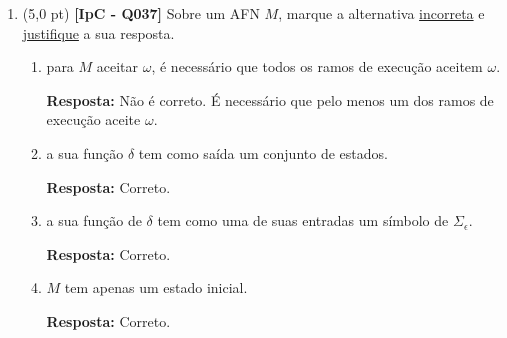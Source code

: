 \documentclass[12pt,a4paper,oneside]{article}
\begin{document}
\begin{enumerate}
	{ \color{blue} {\bf Resposta:} Seja um AFN $N = \{Q, \Sigma \delta, q_0, F\}$. Podemos construir um AFN $O = \{Q', \Sigma' \delta', q_0', F'\}$ que seja equivalente a $N$. Os elementos de $O$ são descritos a seguir:
		\begin{itemize}
			\item $Q' = Q \cup \{q_{novo}\}$;
			\item $\Sigma' = \Sigma$;
			\item $\delta'(q,a) = \left\{\begin{array}{cl}
				\delta(q,a), & \text{se } q \in Q \setminus F\\
				\delta(q,a), & \text{se } q \in F \text{ e } a \not= \epsilon\\
				\delta(q,a) \cup \{ q_{novo} \}, & \text{se } q \in F \text{ e } a = \epsilon\\
				\emptyset	& \text{se } q=q_{novo}\\
				\end{array} \right.$\\
			\item $q_0' = q_0$;
			\item $F' = \{ q_{novo} \}$.
		\end{itemize}
		Logo, todo AFN pode ser convertido em um AFN equivalente que tenha apenas um único estado de aceitação $\blacksquare$.
	}

	\item (5,0 pt) {\bf [IpC - Q037]} Sobre um AFN $M$, marque a alternativa \underline{incorreta} e \underline{justifique} a sua resposta.
\begin{enumerate}
\item para $M$ aceitar $\omega$, é necessário que todos os ramos de execução aceitem $\omega$.

\vspace*{0.3cm}

{ \color{red} {\bf Resposta:} Não é correto. É necessário que pelo menos um dos ramos de execução aceite $\omega$.}

\item a sua função $\delta$ tem como saída um conjunto de estados.

\vspace*{0.3cm}

{ \color{blue} {\bf Resposta:} Correto.}

\item a sua função de $\delta$ tem como uma de suas entradas um símbolo de $\Sigma_{\epsilon}$.

\vspace*{0.3cm}

{ \color{blue} {\bf Resposta:} Correto.}

\item $M$ tem apenas um estado inicial.

\vspace*{0.3cm}

{ \color{blue} {\bf Resposta:} Correto.}

\end{enumerate}

\end{enumerate}
\end{document}
